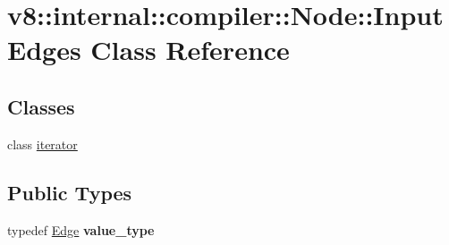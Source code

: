 \hypertarget{classv8_1_1internal_1_1compiler_1_1Node_1_1InputEdges}{}\section{v8\+:\+:internal\+:\+:compiler\+:\+:Node\+:\+:Input\+Edges Class Reference}
\label{classv8_1_1internal_1_1compiler_1_1Node_1_1InputEdges}
\subsection*{Classes}
\begin{DoxyCompactItemize}
\item 
class \mbox{\hyperlink{classv8_1_1internal_1_1compiler_1_1Node_1_1InputEdges_1_1iterator}{iterator}}
\end{DoxyCompactItemize}
\subsection*{Public Types}
\begin{DoxyCompactItemize}
\item 
\mbox{\label{classv8_1_1internal_1_1compiler_1_1Node_1_1InputEdges_a0976a27bc1312135f762d372111e0e4b}} 
typedef \mbox{\hyperlink{classv8_1_1internal_1_1compiler_1_1Edge}{Edge}} {\bfseries value\+\_\+type}
\end{DoxyCompactItemize}
